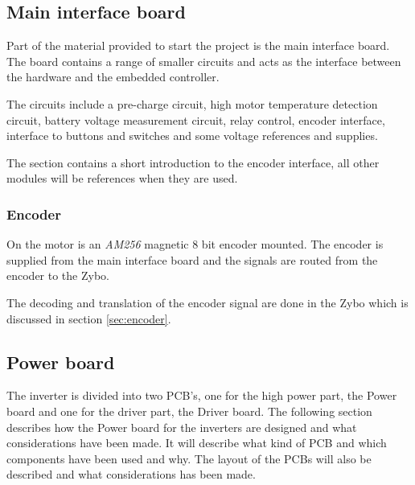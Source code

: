 

\subsection{Main interface board}
Part of the material provided to start the project is the main interface board. The board contains a range of smaller circuits and acts as the interface between the hardware and the embedded controller. 

The circuits include a pre-charge circuit, high motor temperature detection circuit, battery voltage measurement circuit, relay control, encoder interface, interface to buttons and switches and some voltage references and supplies. 

The section contains a short introduction to the encoder interface, all other modules will be references when they are used.



\subsubsection{Encoder}

On the motor is an \textit{AM256} magnetic 8 bit encoder mounted. The encoder is supplied from the main interface board and the signals are routed from the encoder to the Zybo. 

The decoding and translation of the encoder signal are done in the Zybo which is discussed in section \ref{sec:encoder}.





\subsection{Power board}
The inverter is divided into two PCB's, one for the high power part, the Power board and one for the driver part, the Driver board. The following section describes how the Power board for the inverters are designed and what considerations have been made. It will describe what kind of PCB and which components have been used and why. The layout of the PCBs will also be described and what considerations has been made. \\

% 
% 


